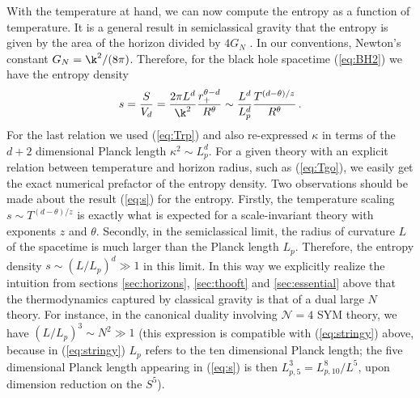 \documentclass[10pt, oneside]{book}
\def\be{\begin{equation}}
\def\ee{\end{equation}}
\begin{document}
\begin{doublespace}
With the temperature at hand, we can now compute the entropy as a function of temperature. It is a general result in semiclassical gravity that the entropy is given by the area of the horizon divided by $4 G_N$ \cite{Gibbons:1976ue, Gibbons:1979xm}. In our conventions, Newton's constant $G_N = \k^2/(8 \pi)$. Therefore, for the black hole spacetime (\ref{eq:BH2}) we have the entropy density
\be\label{eq:s}
s = \frac{S}{V_{d}} = \frac{2 \pi L^{d}}{\k^2} \frac{r^{\theta-d}_+}{R^\theta} \sim \frac{L^{d}}{L_p^{d}} \frac{T^{(d - \theta)/z}}{R^\theta} \,.
\ee
For the last relation we used (\ref{eq:Trp}) and also re-expressed $\kappa$ in terms of the $d+2$ dimensional Planck length $\kappa^2 \sim L_p^{d}$. For a given theory with an explicit relation between temperature and horizon radius, such as (\ref{eq:Tgo}), we easily get the exact numerical prefactor of the entropy density. Two observations should be made about the result (\ref{eq:s}) for the entropy. Firstly, the temperature scaling $s \sim T^{(d-\theta)/z}$ is exactly what is expected for a scale-invariant theory with exponents $z$ and $\theta$. Secondly, in the semiclassical limit, the radius of curvature $L$ of the spacetime is much larger than the Planck length $L_p$. Therefore, the entropy density $s \sim (L/L_p)^{d} \gg1$ in this limit. In this way we explicitly realize the intuition from sections \ref{sec:horizons}, \ref{sec:thooft} and \ref{sec:essential} above that the thermodynamics captured by classical gravity is that of a dual large $N$ theory. For instance, in the canonical duality involving ${\mathcal N} = 4$ SYM theory, we have $(L/L_p)^{3} \sim N^2 \gg 1$ (this expression is compatible with (\ref{eq:stringy}) above, because in (\ref{eq:stringy}) $L_p$ refers to the ten dimensional Planck length; the five dimensional Planck length appearing in (\ref{eq:s}) is then $L_{p,5}^3 = L_{p,10}^8/L^5$, upon dimension reduction on the $S^5$).


\end{doublespace}
\end{document}

